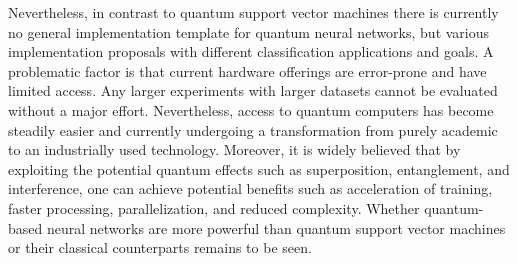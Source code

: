 Nevertheless, in contrast to quantum support vector machines there is currently no general implementation template for quantum neural networks, but various implementation proposals with different classification applications and goals. A problematic factor is that current hardware offerings are error-prone and have limited access. Any larger experiments with larger datasets cannot be evaluated without a major effort. Nevertheless, access to quantum computers has become steadily easier and currently undergoing a transformation from purely academic to an industrially used technology\cite{schuldCircuitcentricQuantumClassifiers2020}. Moreover, it is widely believed that by exploiting the potential quantum effects such as superposition, entanglement, and interference, one can achieve potential benefits such as acceleration of training, faster processing, parallelization, and reduced complexity. Whether quantum-based neural networks are more powerful than quantum support vector machines or their classical counterparts remains to be seen.

